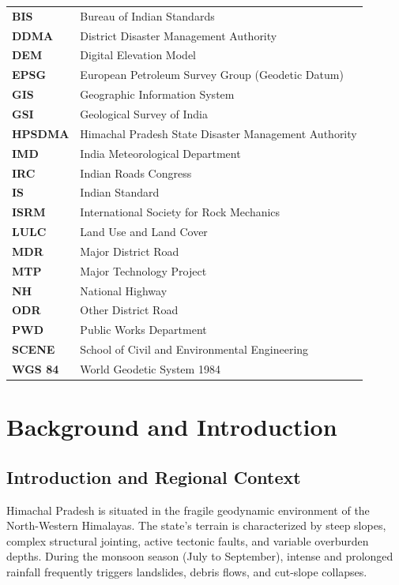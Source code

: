 \documentclass[12pt,a4paper]{report}
\begin{document}
\begin{tabular}{ll}
\textbf{BIS} & Bureau of Indian Standards\\
\textbf{DDMA} & District Disaster Management Authority\\
\textbf{DEM} & Digital Elevation Model\\
\textbf{EPSG} & European Petroleum Survey Group (Geodetic Datum)\\
\textbf{GIS} & Geographic Information System\\
\textbf{GSI} & Geological Survey of India\\
\textbf{HPSDMA} & Himachal Pradesh State Disaster Management Authority\\
\textbf{IMD} & India Meteorological Department\\
\textbf{IRC} & Indian Roads Congress\\
\textbf{IS} & Indian Standard\\
\textbf{ISRM} & International Society for Rock Mechanics\\
\textbf{LULC} & Land Use and Land Cover\\
\textbf{MDR} & Major District Road\\
\textbf{MTP} & Major Technology Project\\
\textbf{NH} & National Highway\\
\textbf{ODR} & Other District Road\\
\textbf{PWD} & Public Works Department\\
\textbf{SCENE} & School of Civil and Environmental Engineering\\
\textbf{WGS 84} & World Geodetic System 1984\\
\end{tabular}

\newpage

\setcounter{page}{1}

\chapter{Background and Introduction}

\section{Introduction and Regional Context}
Himachal Pradesh is situated in the fragile geodynamic environment of the North-Western Himalayas. The state's terrain is characterized by steep slopes, complex structural jointing, active tectonic faults, and variable overburden depths. During the monsoon season (July to September), intense and prolonged rainfall frequently triggers landslides, debris flows, and cut-slope collapses. 
\end{document}

